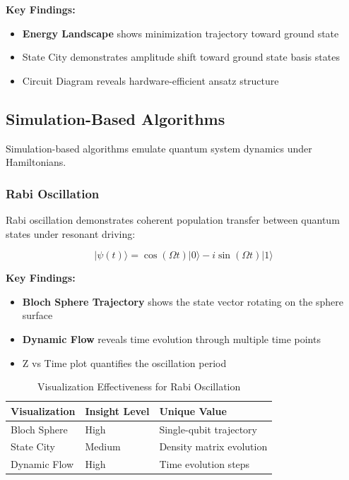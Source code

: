 \documentclass[12pt,a4paper]{article}
\begin{document}
\textbf{Key Findings:}

\begin{itemize}
	\item \textbf{Energy Landscape} shows minimization trajectory toward ground state
	\item State City demonstrates amplitude shift toward ground state basis states
	\item Circuit Diagram reveals hardware-efficient ansatz structure
\end{itemize}

\subsection{Simulation-Based Algorithms}

Simulation-based algorithms emulate quantum system dynamics under Hamiltonians.

\subsubsection{Rabi Oscillation}

Rabi oscillation demonstrates coherent population transfer between quantum states under resonant driving:

\begin{equation}
	|\psi(t)\rangle = \cos(\Omega t)|0\rangle - i\sin(\Omega t)|1\rangle
\end{equation}

\textbf{Key Findings:}

\begin{itemize}
	\item \textbf{Bloch Sphere Trajectory} shows the state vector rotating on the sphere surface
	\item \textbf{Dynamic Flow} reveals time evolution through multiple time points
	\item Z vs Time plot quantifies the oscillation period
\end{itemize}

\begin{table}[h!]
	\centering
	\caption{Visualization Effectiveness for Rabi Oscillation}
	\label{tab:rabi_visualization}
	\begin{tabular}{@{}lll@{}}
		\toprule
		\textbf{Visualization} & \textbf{Insight Level} & \textbf{Unique Value}    \\ \midrule
		Bloch Sphere           & High                   & Single-qubit trajectory  \\
		State City             & Medium                 & Density matrix evolution \\
		Dynamic Flow           & High                   & Time evolution steps     \\ \bottomrule
	\end{tabular}
\end{table}
\end{document}

